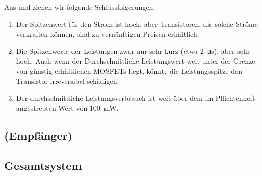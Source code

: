 Aus   und   ziehen wir
folgende Schlussfolgerungen:

\begin{enumerate}
    \firmlist
    \item
        Der  Spitzenwert f\"ur  den  Strom ist  hoch,  aber Transistoren,  die
        solche Str\"ome  verkraften k\"onnen,  sind zu  vern\"unftigen Preisen
        erh\"altlich.
    \item
        Die    Spitzenwerte    der    Leistungen   zwar    nur    sehr    kurz
        (etwa   \SI{2}{\micro\second}),   aber   sehr  hoch. Auch   wenn   der
        Durchschnittliche Leistungswert  weit unter  der Grenze  von g\"unstig
        erh\"altlichen  MOSFETs   liegt,  k\"onnte  die   Leistungsspitze  den
        Transistor irreversibel sch\"adigen.
    \item
        Der  durchschnittliche  Leistungsverbrauch  ist  weit  \"uber  dem  im
        Pflichtenheft angestrebten Wert von \SI{100}{\milli\watt}.
\end{enumerate}


\clearpage
\subsection{\Master (Empf\"anger)}
\label{subsec:simu:ask:recv}


\subsection{Gesamtsystem}
\label{subsec:simu:ask:total}
